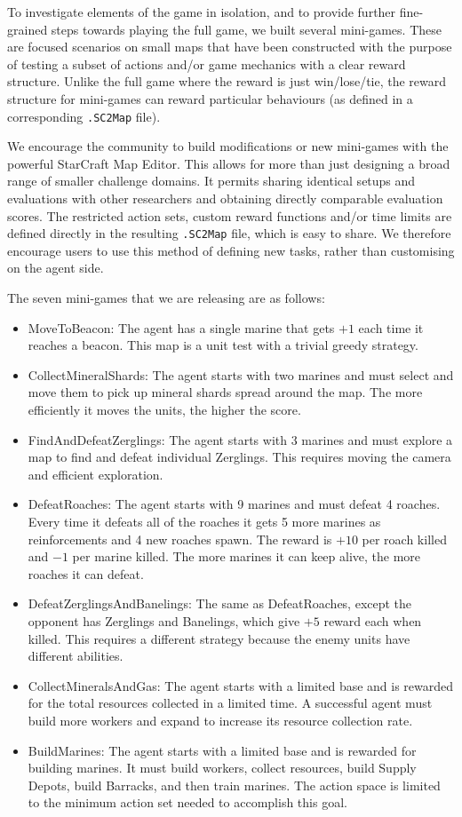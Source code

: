 To investigate elements of the game in isolation, and to provide further fine-grained steps towards playing the full game, we built several mini-games. These are focused scenarios on small maps that have been constructed with the purpose of testing a subset of actions and/or game mechanics with a clear reward structure. Unlike the full game where the reward is just win/lose/tie, the reward structure for mini-games can reward particular behaviours (as defined in a corresponding \texttt{.SC2Map} file). 

We encourage the community to build modifications or new mini-games with the powerful StarCraft Map Editor. This allows for more than just designing a broad range of smaller challenge domains. It permits sharing identical setups and evaluations with other researchers and obtaining directly comparable evaluation scores. The restricted action sets, custom reward functions and/or time limits are defined directly in the resulting \texttt{.SC2Map} file, which is easy to share. We therefore encourage users to use this method of defining new tasks, rather than customising on the agent side.

The seven mini-games that we are releasing are as follows:

\begin{itemize}
\item MoveToBeacon: The agent has a single marine that gets $+1$ each time it reaches a beacon. This map is a unit test with a trivial greedy strategy.
\item CollectMineralShards: The agent starts with two marines and must select and move them to pick up mineral shards spread around the map. The more efficiently it moves the units, the higher the score.
\item FindAndDefeatZerglings: The agent starts with 3 marines and must explore a map to find and defeat individual Zerglings. This requires moving the camera and efficient exploration.
\item DefeatRoaches: The agent starts with 9 marines and must defeat 4 roaches. Every time it defeats all of the roaches it gets 5 more marines as reinforcements and 4 new roaches spawn. The reward is $+10$ per roach killed and $-1$ per marine killed. The more marines it can keep alive, the more roaches it can defeat.
\item DefeatZerglingsAndBanelings: The same as DefeatRoaches, except the opponent has Zerglings and Banelings, which give $+5$ reward each when killed. This requires a different strategy because the enemy units have different abilities.
\item CollectMineralsAndGas: The agent starts with a limited base and is rewarded for the total resources collected in a limited time. A successful agent must build more workers and expand to increase its resource collection rate.
\item BuildMarines: The agent starts with a limited base and is rewarded for building marines. It must build workers, collect resources, build Supply Depots, build Barracks, and then train marines. The action space is limited to the minimum action set needed to accomplish this goal.
\end{itemize}

